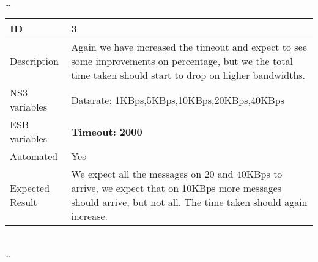 \begin{center}
\\ \ldots \\

\begin{tabular}{| p{4cm} | p{8cm} |}%
    \hline
    ID & 3 \\
    \hline
    Description & Again we have increased the timeout and expect to see some improvements on percentage, but we the total time taken should start to drop on higher bandwidths.  \\
    \hline
    NS3 variables & Datarate: 1KBps,5KBps,10KBps,20KBps,40KBps \\
    \hline
    ESB variables & \textbf{Timeout: 2000} \\
    \hline
    Automated & Yes \\
    \hline
    Expected Result & We expect all the messages on 20 and 40KBps to arrive, we expect that on 10KBps more messages should arrive, but not all. The time taken should again increase. \\
    \hline
\end{tabular}

\\ \ldots \\


\end{center}
